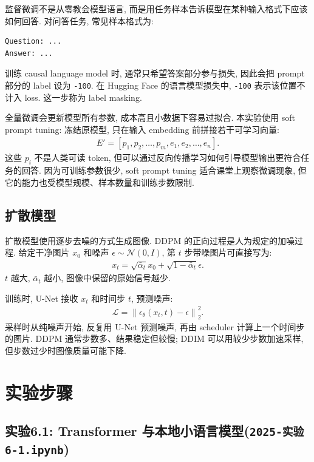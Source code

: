 \documentclass{../../nndlcourse}
\begin{document}
监督微调不是从零教会模型语言, 而是用任务样本告诉模型在某种输入格式下应该如何回答. 对问答任务, 常见样本格式为:
\begin{verbatim}
Question: ...
Answer: ...
\end{verbatim}
训练 causal language model 时, 通常只希望答案部分参与损失, 因此会把 prompt 部分的 label 设为 \texttt{-100}. 在 Hugging Face 的语言模型损失中, \texttt{-100} 表示该位置不计入 loss. 这一步称为 label masking.

全量微调会更新模型所有参数, 成本高且小数据下容易过拟合. 本实验使用 soft prompt tuning: 冻结原模型, 只在输入 embedding 前拼接若干可学习向量:
\begin{align}
    E' = [p_1,p_2,\ldots,p_m,e_1,e_2,\ldots,e_n].
\end{align}
这些 $p_i$ 不是人类可读 token, 但可以通过反向传播学习如何引导模型输出更符合任务的回答. 因为可训练参数很少, soft prompt tuning 适合课堂上观察微调现象, 但它的能力也受模型规模、样本数量和训练步数限制.

\subsection{扩散模型}

扩散模型使用逐步去噪的方式生成图像. DDPM 的正向过程是人为规定的加噪过程. 给定干净图片 $x_0$ 和噪声 $\epsilon\sim\mathcal{N}(0,I)$, 第 $t$ 步带噪图片可直接写为:
\begin{align}
    x_t =
    \sqrt{\bar{\alpha}_t}x_0
    +
    \sqrt{1-\bar{\alpha}_t}\epsilon .
\end{align}
$t$ 越大, $\bar{\alpha}_t$ 越小, 图像中保留的原始信号越少.

训练时, U-Net 接收 $x_t$ 和时间步 $t$, 预测噪声:
\begin{align}
    \mathcal{L}
    =
    \left\|
    \epsilon_\theta(x_t,t)-\epsilon
    \right\|_2^2.
\end{align}
采样时从纯噪声开始, 反复用 U-Net 预测噪声, 再由 scheduler 计算上一个时间步的图片. DDPM 通常步数多、结果稳定但较慢; DDIM 可以用较少步数加速采样, 但步数过少时图像质量可能下降.


\section{实验步骤}

\subsection*{实验6.1: Transformer 与本地小语言模型(\texttt{2025-实验6-1.ipynb})}
\end{document}
